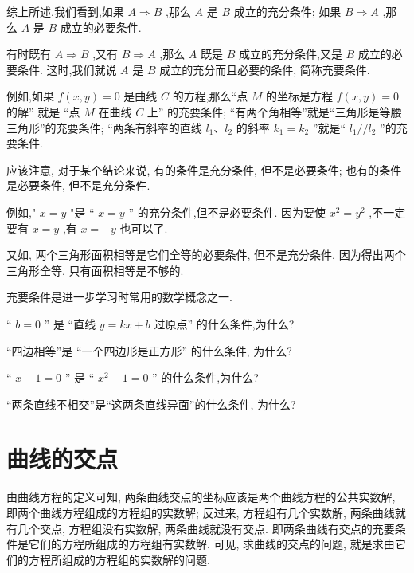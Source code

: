 \documentclass[lang=cn,newtx,10pt,scheme=chinese]{elegantbook}
\begin{document}
综上所述,我们看到,如果 \(A \Rightarrow B\) ,那么 \(A\) 是 \(B\) 成立的充分条件; 如果 \(B \Rightarrow A\) ,那么 \(A\) 是 \(B\) 成立的必要条件.

有时既有 \(A \Rightarrow B\) ,又有 \(B \Rightarrow A\) ,那么 \(A\) 既是 \(B\) 成立的充分条件,又是 \(B\) 成立的必要条件. 这时,我们就说 \(A\) 是 \(B\) 成立的充分而且必要的条件, 简称充要条件.

例如,如果 \(f\left( {x,y}\right) = 0\) 是曲线 \(C\) 的方程,那么“点 \(M\) 的坐标是方程 \(f\left( {x,y}\right) = 0\) 的解” 就是 “点 \(M\) 在曲线 \(C\) 上” 的充要条件; “有两个角相等”就是“三角形是等腰三角形”的充要条件; “两条有斜率的直线 \({l}_{1}\text{、}{l}_{2}\) 的斜率 \({k}_{1} = {k}_{2}\) ”就是“ \({l}_{1}//{l}_{2}\) ”的充要条件.

应该注意, 对于某个结论来说, 有的条件是充分条件, 但不是必要条件; 也有的条件是必要条件, 但不是充分条件.

例如," \(x = y\) "是 “ \(x = y\) ” 的充分条件,但不是必要条件. 因为要使 \({x}^{2} = {y}^{2}\) ,不一定要有 \(x = y\) ,有 \(x = - y\) 也可以了.

又如, 两个三角形面积相等是它们全等的必要条件, 但不是充分条件. 因为得出两个三角形全等, 只有面积相等是不够的.

充要条件是进一步学习时常用的数学概念之一.

\begin{problemset}[练习]

\item “ \(b = 0\) ” 是 “直线 \(y = {kx} + b\) 过原点” 的什么条件,为什么?

\item “四边相等”是 “一个四边形是正方形” 的什么条件, 为什么?

\item “ \(x - 1 = 0\) ” 是 “ \({x}^{2} - 1 = 0\) ” 的什么条件,为什么?

\item “两条直线不相交”是“这两条直线异面”的什么条件, 为什么?
\end{problemset}

\section{曲线的交点}

由曲线方程的定义可知, 两条曲线交点的坐标应该是两个曲线方程的公共实数解, 即两个曲线方程组成的方程组的实数解; 反过来, 方程组有几个实数解, 两条曲线就有几个交点, 方程组没有实数解, 两条曲线就没有交点. 即两条曲线有交点的充要条件是它们的方程所组成的方程组有实数解. 可见, 求曲线的交点的问题, 就是求由它们的方程所组成的方程组的实数解的问题.
\end{document}
